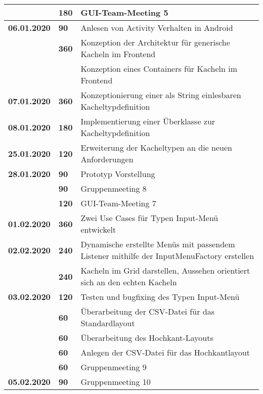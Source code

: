 {\begin{longtable}{|l|l|p{11cm}|}
		& \textbf{\hfill 180} & GUI-Team-Meeting 5
		\\	
		\hline \textbf{06.01.2020}
		& \textbf{\hfill 90} & Anlesen von Activity Verhalten in Android \\\cline{2-3}
		& \textbf{\hfill 360} & Konzeption der Architektur für generische Kacheln im Frontend \\
		& & Konzeption eines Containers für Kacheln im Frontend
		\\	
		\hline \textbf{07.01.2020}
		& \textbf{\hfill 360} & Konzeptionierung einer als String einlesbaren Kacheltypdefinition
		\\	
		\hline \textbf{08.01.2020}
		& \textbf{\hfill 180} & Implementierung einer Überklasse zur Kacheltypdefinition
		\\
		\hline \textbf{25.01.2020}
		& \textbf{\hfill 120} & Erweiterung der Kacheltypen an die neuen Anforderungen
		\\		
		\hline \textbf{28.01.2020}
		& \textbf{\hfill 90} & Prototyp Vorstellung \\\cline{2-3}
		& \textbf{\hfill 90} & Gruppenmeeting 8 \\\cline{2-3}
		& \textbf{\hfill 120} & GUI-Team-Meeting 7
		\\	
		\hline \textbf{01.02.2020}
		& \textbf{\hfill 360} & Zwei  Use Cases für Typen Input-Menü entwickelt
		\\	
		\hline \textbf{02.02.2020}
		& \textbf{\hfill 240} & Dynamische erstellte Menüs mit passendem Listener mithilfe der InputMenuFactory erstellen \\\cline{2-3}
		& \textbf{\hfill 240} & Kacheln im Grid darstellen, Aussehen orientiert sich an den echten Kacheln
		\\	
		\hline \textbf{03.02.2020}
		& \textbf{\hfill 120} & Testen und bugfixing des Typen Input-Menü \\\cline{2-3}
		& \textbf{\hfill 60} & Überarbeitung der CSV-Datei für das Standardlayout \\\cline{2-3}
		& \textbf{\hfill 60} & Überarbeitung des Hochkant-Layouts \\\cline{2-3}
		& \textbf{\hfill 60} & Anlegen der CSV-Datei für das Hochkantlayout \\\cline{2-3}
		& \textbf{\hfill 60} & Gruppenmeeting 9
		\\
		\hline \textbf{05.02.2020}
		& \textbf{\hfill 90} & Gruppenmeeting 10
		\\ \hline\hline
	\end{longtable}
}

